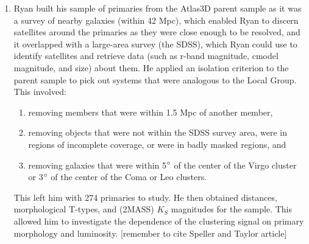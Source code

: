 \documentclass[10pt,letterpaper]{article}
\begin{document}
\begin{enumerate}
\item Ryan built his sample of primaries from the Atlas3D parent sample as it was a survey of nearby galaxies (within 42 Mpc), which enabled Ryan to discern satellites around the primaries as they were close enough to be resolved, and it overlapped with a large-area survey (the SDSS), which Ryan could use to identify satellites and retrieve data (such as r-band magnitude, cmodel magnitude, and size) about them. He applied an isolation criterion to the parent sample to pick out systems that were analogous to the Local Group. This involved:

\begin{enumerate}[i]
\item removing members that were within 1.5 Mpc of another member,
\item removing objects that were not within the SDSS survey area, were in regions of incomplete coverage, or were in badly masked regions, and
\item removing galaxies that were within 5$\degree$ of the center of the Virgo cluster or 3$\degree$ of the center of the Coma or Leo clusters.
\end{enumerate} 

This left him with 274 primaries to study. He then obtained distances, morphological T-types, and (2MASS) $K_S$ magnitudes for the sample. This allowed him to investigate the dependence of the clustering signal on primary morphology and luminosity. [remember to cite Speller and Taylor article]


\end{enumerate}
\end{document}
